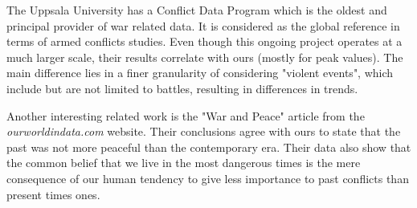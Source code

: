 The Uppsala University has a Conflict Data Program\cite{UCDP} which is the oldest and principal provider of war related data. It is considered as the global reference in terms of armed conflicts studies. Even though this ongoing project operates at a much larger scale, their results correlate with ours (mostly for peak values). The main difference lies in a finer granularity of considering "violent events", which include but are not limited to battles, resulting in differences in trends.

Another interesting related work is the "War and Peace" article from the \textit{ourworldindata.com} website\cite{warandpeace}. Their conclusions agree with ours to state that the past was not more peaceful than the contemporary era. Their data also show that the common belief that we live in the most dangerous times is the mere consequence of our human tendency to give less importance to past conflicts than present times ones.

